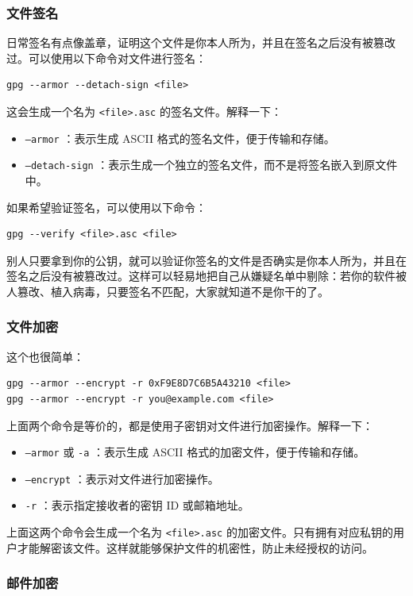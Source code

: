 \subsubsection{文件签名}

日常签名有点像盖章，证明这个文件是你本人所为，并且在签名之后没有被篡改过。可以使用以下命令对文件进行签名：
\begin{verbatim}
gpg --armor --detach-sign <file>
\end{verbatim}
这会生成一个名为  \texttt{<file>.asc}  的签名文件。解释一下：
\begin{itemize}
  \item  \texttt{--armor} ：表示生成 ASCII 格式的签名文件，便于传输和存储。
  \item  \texttt{--detach-sign} ：表示生成一个独立的签名文件，而不是将签名嵌入到原文件中。
\end{itemize}

如果希望验证签名，可以使用以下命令：
\begin{verbatim}
gpg --verify <file>.asc <file>
\end{verbatim}

别人只要拿到你的公钥，就可以验证你签名的文件是否确实是你本人所为，并且在签名之后没有被篡改过。这样可以轻易地把自己从嫌疑名单中剔除：若你的软件被人篡改、植入病毒，只要签名不匹配，大家就知道不是你干的了。

\subsubsection{文件加密}

这个也很简单：
\begin{verbatim}
gpg --armor --encrypt -r 0xF9E8D7C6B5A43210 <file>
gpg --armor --encrypt -r you@example.com <file>
\end{verbatim}
上面两个命令是等价的，都是使用子密钥对文件进行加密操作。解释一下：
\begin{itemize}
  \item  \texttt{--armor}  或  \texttt{-a} ：表示生成 ASCII 格式的加密文件，便于传输和存储。
  \item  \texttt{--encrypt} ：表示对文件进行加密操作。
  \item  \texttt{-r} ：表示指定接收者的密钥 ID 或邮箱地址。
\end{itemize}

上面这两个命令会生成一个名为  \texttt{<file>.asc}  的加密文件。只有拥有对应私钥的用户才能解密该文件。这样就能够保护文件的机密性，防止未经授权的访问。

\subsubsection{邮件加密}

